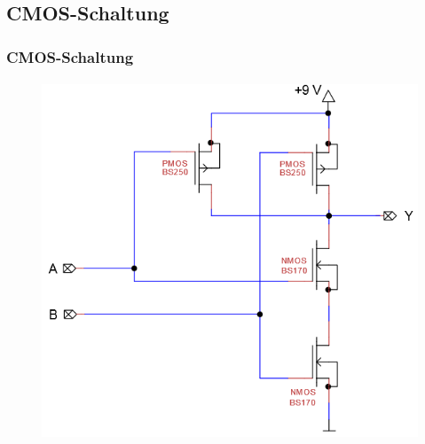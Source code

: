 \subsection{CMOS-Schaltung} %
\label{sub:CMOS-Schaltung}
\begin{frame}
    \frametitle{CMOS-Schaltung}
    \framesubtitle{}
    \begin{figure}[H]
    \begin{center}
            \includegraphics[scale=0.5]{./img/schaltung/1b_cmos.png}
    \end{center}
    \end{figure}    
\end{frame}

